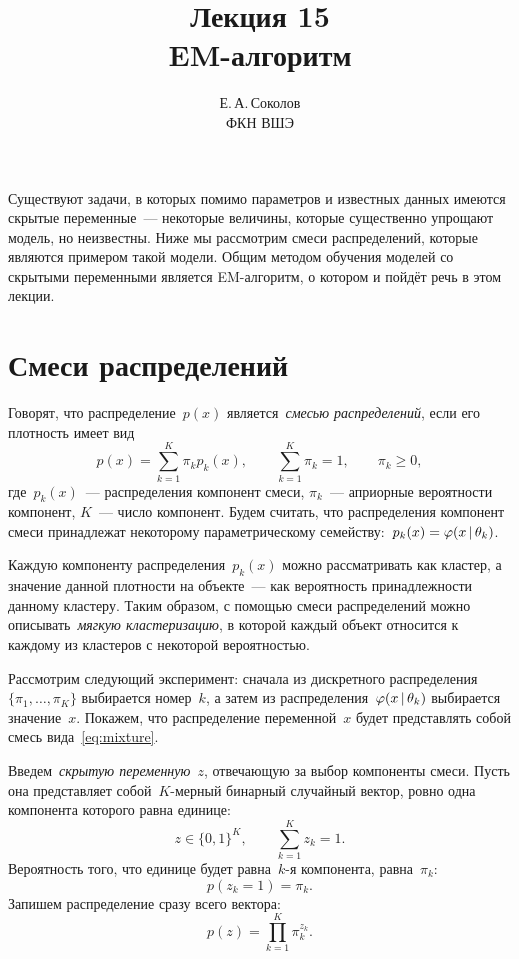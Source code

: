 \documentclass[12pt,fleqn]{article}
\begin{document}
\title{Лекция 15\\EM-алгоритм}
\author{Е.\,А.\,Соколов\\ФКН ВШЭ}
\maketitle

Существуют задачи, в которых помимо параметров и известных данных имеются
скрытые переменные~--- некоторые величины, которые существенно упрощают модель,
но неизвестны.
Ниже мы рассмотрим смеси распределений, которые являются примером такой модели.
Общим методом обучения моделей со скрытыми переменными является EM-алгоритм,
о котором и пойдёт речь в этом лекции.

\section{Смеси распределений}
Говорят, что распределение~$p(x)$ является~\emph{смесью распределений},
если его плотность имеет вид
\begin{equation}
\label{eq:mixture}
    p(x)
    =
    \sum_{k = 1}^{K} \pi_k p_k(x),
    \qquad
    \sum_{k = 1}^{K} \pi_k = 1,
    \qquad
    \pi_k \geq 0,
\end{equation}
где~$p_k(x)$~--- распределения компонент смеси,
$\pi_k$~--- априорные вероятности компонент,
$K$~--- число компонент.
Будем считать, что распределения компонент смеси принадлежат
некоторому параметрическому семейству:~$p_k(x) = \varphi(x \mspace{3mu}{|}\mspace{3mu} \theta_k)$.

Каждую компоненту распределения~$p_k(x)$ можно рассматривать как кластер,
а значение данной плотности на объекте~--- как вероятность принадлежности
данному кластеру.
Таким образом, с помощью смеси распределений можно описывать~\emph{мягкую кластеризацию},
в которой каждый объект относится к каждому из кластеров с некоторой вероятностью.

Рассмотрим следующий эксперимент:
сначала из дискретного распределения~$\{\pi_1, \dots, \pi_K\}$
выбирается номер~$k$, а затем из
распределения~$\varphi(x \mspace{3mu}{|}\mspace{3mu} \theta_k)$ выбирается значение~$x$.
Покажем, что распределение переменной~$x$ будет представлять собой смесь
вида~\eqref{eq:mixture}.

Введем~\emph{скрытую переменную}~$z$, отвечающую за выбор компоненты смеси.
Пусть она представляет собой~$K$-мерный
бинарный случайный вектор, ровно одна компонента которого равна единице:
\[
    z \in \{0, 1\}^K,
    \qquad
    \sum_{k = 1}^{K} z_k = 1.
\]
Вероятность того, что единице будет равна~$k$-я компонента, равна~$\pi_k$:
\[
    p(z_k = 1) = \pi_k.
\]
Запишем распределение сразу всего вектора:
\[
    p(z) = \prod_{k = 1}^{K} \pi_k^{z_k}.
\]
\end{document}
